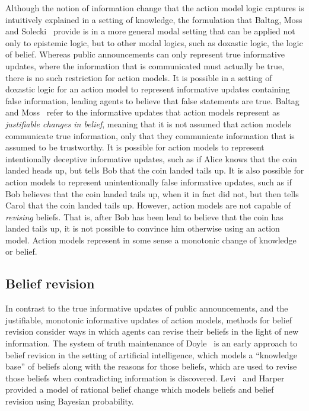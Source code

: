 Although the notion of information change that the action model logic captures is intuitively explained in a setting of knowledge, the formulation that Baltag, Moss and Solecki~\cite{baltag:1998} provide is in a more general modal setting that can be applied not only to epistemic logic, but to other modal logics, such as doxastic logic, the logic of belief.
Whereas public announcements can only represent true informative updates, where the information that is communicated must actually be true, there is no such restriction for action models.
It is possible in a setting of doxastic logic for an action model to represent informative updates containing false information, leading agents to believe that false statements are true.
Baltag and Moss~\cite{baltag:2004} refer to the informative updates that action models represent as {\em justifiable changes in belief}, meaning that it is not assumed that action models communicate true information, only that they communicate information that is assumed to be trustworthy.
It is possible for action models to represent intentionally deceptive informative updates, such as if Alice knows that the coin landed heads up, but tells Bob that the coin landed tails up.
It is also possible for action models to represent unintentionally false informative updates, such as if Bob believes that the coin landed tails up, when it in fact did not, but then tells Carol that the coin landed tails up. 
However, action models are not capable of {\em revising} beliefs.
That is, after Bob has been lead to believe that the coin has landed tails up, it is not possible to convince him otherwise using an action model. Action models represent in some sense a monotonic change of knowledge or belief.

\subsection{Belief revision}

In contrast to the true informative updates of public announcements, and the justifiable, monotonic informative updates of action models, methods for belief revision consider ways in which agents can revise their beliefs in the light of new information.
The system of truth maintenance of Doyle~\cite{doyle:1979} is an early approach to belief revision in the setting of artificial intelligence, which models a ``knowledge base'' of beliefs along with the reasons for those beliefs, which are used to revise those beliefs when contradicting information is discovered. 
Levi~\cite{levi:1983} and Harper~\cite{harper:1976} provided a model of rational belief change which models beliefs and belief revision using Bayesian probability.

